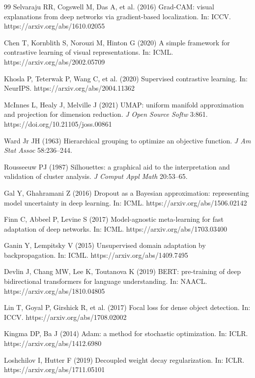 \documentclass[12pt]{article}
\begin{document}
\begin{thebibliography}{99}
Selvaraju RR, Cogswell M, Das A, et al. (2016) Grad-CAM: visual explanations from deep networks via gradient-based localization. In: ICCV. https://arxiv.org/abs/1610.02055

Chen T, Kornblith S, Norouzi M, Hinton G (2020) A simple framework for contrastive learning of visual representations. In: ICML. https://arxiv.org/abs/2002.05709

Khosla P, Teterwak P, Wang C, et al. (2020) Supervised contrastive learning. In: NeurIPS. https://arxiv.org/abs/2004.11362

McInnes L, Healy J, Melville J (2021) UMAP: uniform manifold approximation and projection for dimension reduction. \textit{J Open Source Softw} 3:861. https://doi.org/10.21105/joss.00861

Ward Jr JH (1963) Hierarchical grouping to optimize an objective function. \textit{J Am Stat Assoc} 58:236--244.

Rousseeuw PJ (1987) Silhouettes: a graphical aid to the interpretation and validation of cluster analysis. \textit{J Comput Appl Math} 20:53--65.

Gal Y, Ghahramani Z (2016) Dropout as a Bayesian approximation: representing model uncertainty in deep learning. In: ICML. https://arxiv.org/abs/1506.02142

Finn C, Abbeel P, Levine S (2017) Model-agnostic meta-learning for fast adaptation of deep networks. In: ICML. https://arxiv.org/abs/1703.03400

Ganin Y, Lempitsky V (2015) Unsupervised domain adaptation by backpropagation. In: ICML. https://arxiv.org/abs/1409.7495

Devlin J, Chang MW, Lee K, Toutanova K (2019) BERT: pre-training of deep bidirectional transformers for language understanding. In: NAACL. https://arxiv.org/abs/1810.04805

Lin T, Goyal P, Girshick R, et al. (2017) Focal loss for dense object detection. In: ICCV. https://arxiv.org/abs/1708.02002

Kingma DP, Ba J (2014) Adam: a method for stochastic optimization. In: ICLR. https://arxiv.org/abs/1412.6980

Loshchilov I, Hutter F (2019) Decoupled weight decay regularization. In: ICLR. https://arxiv.org/abs/1711.05101

\end{thebibliography}
\end{document}
